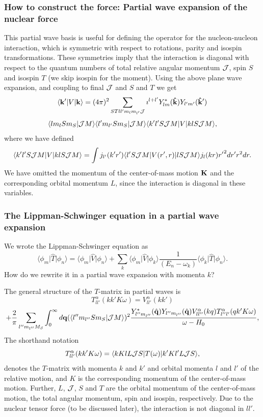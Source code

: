 \documentclass[compress]{beamer}
\newcommand*{\ket}[1]{|#1\rangle}
\newcommand*{\bra}[1]{\langle#1|}
\begin{document}
\frame
{
\frametitle{How to construct the force: Partial wave expansion of the nuclear force}

\begin{small}
{\scriptsize
This partial wave basis is useful for defining the operator for
the nucleon-nucleon interaction, which
is symmetric with respect to rotations, parity and
isospin transformations. These symmetries imply that the interaction is
diagonal with respect to the quantum numbers of total relative angular
momentum ${\cal J}$, spin $S$ and isospin $T$ (we skip isospin for the moment). Using the above plane wave expansion,
and coupling to final ${\cal J}$ and $S$ and $T$ we get
\[
      \bra{{\bf k'}} V \ket{{\bf k}}
       = (4\pi)^2 \sum_{STll'm_lm_{l'}{\cal J}}
      \imath ^{l+l'} Y_{lm}^{*}({\bf \hat{k}}) Y_{l'm'}({\bf \hat{k}'})
\]
\[
      \langle lm_lSm_S|{\cal J}M\rangle \langle l'm_{l'}Sm_S|{\cal J}M\rangle          
      \bra{k'l'S{\cal J}M}V \ket{klS{\cal J}M},
\]
where we have defined
\begin{equation}
    \bra{k'l'S{\cal J}M}V \ket{klS{\cal J}M}=
    \int   j_{l'}(k'r')\bra{l'S{\cal J}M}V(r',r)\ket{lS{\cal J}M}j_l(kr) {r'}^2 dr' r^2 dr.
\end{equation}
We have omitted the momentum of the center-of-mass motion ${\bf K}$ and the 
corresponding orbital momentum $L$, since the interaction is diagonal
in these variables.
}
\end{small}
}

\frame
{
\frametitle{The Lippman-Schwinger equation in a partial wave expansion}
\begin{small}
{\scriptsize
We wrote the Lippman-Schwinger equation as
\[
\langle \phi_m \vert\hat{T}\vert \phi_n \rangle =\langle \phi_m \vert\hat{V}\vert\phi_n \rangle+\sum_k \langle \phi_m \vert\hat{V}\vert \phi_k\rangle\frac{1}{(E_n -\omega_k)}\langle \phi_k \vert\hat{T}\vert \phi_n \rangle.
\]
How do we rewrite it in a partial wave expansion with momenta $k$?
}
\end{small}
}




\frame
{
\begin{small}
{\scriptsize

The general structure of the $T$-matrix in partial waves is
\[
   T_{ll'}^{\alpha}(kk'K\omega)=V_{ll'}^{\alpha}(kk')
\]
\[
   +{\displaystyle \frac{2}{\pi}\sum_{l''m_{l''}M_S}\int_{0}^{\infty} d {\bf q}
   (\langle l''m_{l''}Sm_S|{\cal J}M\rangle)^2
   \frac{Y_{l''m_{l''}}^*(\hat{{\bf q}})
   Y_{l''m_{l''}}(\hat{{\bf q}}) V_{ll''}^{\alpha}(kq)
   T_{l''l'}^{\alpha}(qk'K\omega)}
   {\omega -H_0}},
   \label{eq:bspartial}
\]
The  shorthand notation
\[
    T_{ll'}^{\alpha}(kk'K\omega)=
   \bra{kKlL{\cal J}S}T(\omega)\ket{k'Kl'L{\cal J}S},
\]
denotes the $T$-matrix
with momenta $k$ and $k'$ and orbital momenta $l$ and $l'$
of the relative motion, and
$K$ is the corresponding momentum of
the center-of-mass motion. Further, $L$, ${\cal J}$, $S$ and $T$
are the orbital momentum of the center-of-mass motion, the
total angular momentum,
spin and isospin, respectively. 
Due to the nuclear tensor force (to be discussed later), the interaction is not diagonal in $ll'$.
}
\end{small}

}
\end{document}
